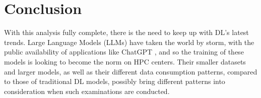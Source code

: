 \documentclass[conference]{IEEEtran}
\begin{document}
\section{Conclusion}

With this analysis fully complete, there is the need to keep up with DL's latest trends. Large Language Models (LLMs) have taken the world by storm, with the public availability of applications like ChatGPT \cite{chatgpt}, and so the training of these models is looking to become the norm on HPC centers. Their smaller datasets and larger models, as well as their different data consumption patterns, compared to those of traditional DL models, possibly bring different patterns into consideration when such examinations are conducted. 


\end{document}
